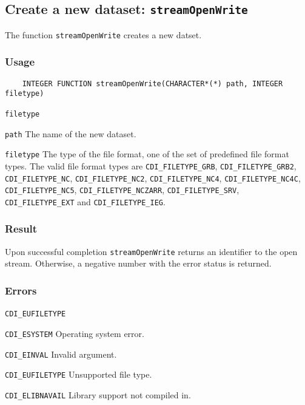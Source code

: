 

\subsection{Create a new dataset: \texttt{streamOpenWrite}}
\label{streamOpenWrite}

The function {\texttt{streamOpenWrite}} creates a new datset.
\subsubsection*{Usage}

\begin{verbatim}
    INTEGER FUNCTION streamOpenWrite(CHARACTER*(*) path, INTEGER filetype)
\end{verbatim}

\hspace*{4mm}\begin{minipage}[]{15cm}
\begin{deflist}{\texttt{filetype}\ }
\item[\texttt{path}]
The name of the new dataset.
\item[\texttt{filetype}]
The type of the file format, one of the set of predefined {\CDI} file format types.
                     The valid {\CDI} file format types are {\texttt{CDI\_FILETYPE\_GRB}}, {\texttt{CDI\_FILETYPE\_GRB2}}, {\texttt{CDI\_FILETYPE\_NC}},
                     {\texttt{CDI\_FILETYPE\_NC2}}, {\texttt{CDI\_FILETYPE\_NC4}}, {\texttt{CDI\_FILETYPE\_NC4C}}, {\texttt{CDI\_FILETYPE\_NC5}},
                     {\texttt{CDI\_FILETYPE\_NCZARR}}, {\texttt{CDI\_FILETYPE\_SRV}}, {\texttt{CDI\_FILETYPE\_EXT}} and {\texttt{CDI\_FILETYPE\_IEG}}.

\end{deflist}
\end{minipage}

\subsubsection*{Result}

Upon successful completion {\texttt{streamOpenWrite}} returns an identifier to the
open stream. Otherwise, a negative number with the error status is returned.


\subsubsection*{Errors}


\hspace*{4mm}\begin{minipage}[]{15cm}
\begin{deflist}{\texttt{CDI\_EUFILETYPE}\ }
\item[\texttt{CDI\_ESYSTEM}]
Operating system error.
\item[\texttt{CDI\_EINVAL}]
Invalid argument.
\item[\texttt{CDI\_EUFILETYPE}]
Unsupported file type.
\item[\texttt{CDI\_ELIBNAVAIL}]
Library support not compiled in.
\end{deflist}
\end{minipage}


